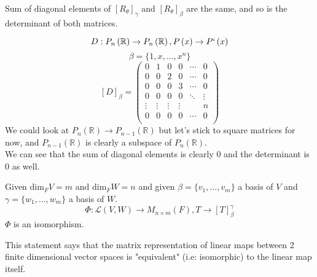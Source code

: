 \documentclass[11pt,a4paper]{colorart}
\def\l{\left}
\def\r{\right}
\def\R{\mathbb{R}}
\def\b{\beta}
\def\g{\gamma}
\def\L{\mathcal{L}}
\begin{document}
\begin{remark}
	Sum of diagonal elements of $\l[R_\theta\r]_\g$ and $\l[R_\theta\r]_\b$ are the same, and so is the determinant of both matrices. 
\end{remark}

\begin{example}
	\[ D:P_n\l(\R\r) \rightarrow P_n\l(\R\r), P\l(x\r) \rightarrow P`\l(x\r) \]
	\[ \b = \{1,x,\dots,x^n\} \]
	\[ \l[D\r]_\b  = \begin{pmatrix} 
	   0 & 1 & 0 & 0 & \cdots & 0\\
	   0 & 0 & 2 & 0 & \cdots & 0\\
	   0 & 0 & 0 & 3 & \cdots & 0\\
	   0 & 0 & 0 & 0 & \ddots & \vdots\\
	   \vdots & \vdots & \vdots & \vdots &  & n\\
	   0 & 0 & 0 & 0 & \cdots & 0\\
	   \end{pmatrix}\]  
We could look at  $P_n\l(\R\r) \rightarrow P_{n-1}\l(\R\r)$ but let's stick to square matrices for now, and $P_{n-1}\l(\R\r)$ is clearly a subspace of $P_n\l(\R\r)$. \\

We can see that the sum of diagonal elements is clearly 0 and the determinant is 0 as well.

\end{example}

\begin{proposition}
	Given dim$_FV=m$ and dim$_FW=n$ and given $\b = \{v_1,\dots,v_m\}$ a basis of $V$ and $\g = \{w_1,\dots,w_m\}$ a basis of $W$.
	\[ \Phi: \L\l(V,W\r) \rightarrow M_{n\times m}\l(F\r), T\rightarrow \l[T\r]_\b^\g   \]
	$\Phi$ is an isomorphism.
\end{proposition}

\begin{remark}
	This statement says that the matrix representation of linear maps between 2 finite dimensional vector spaces is "equivalent" (i.e: isomorphic) to the linear map itself.
\end{remark}
\end{document}
